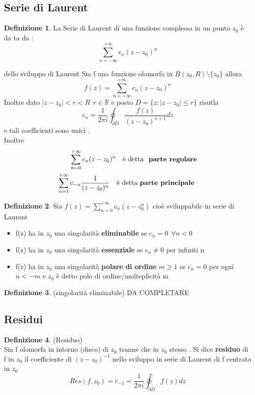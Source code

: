 \documentclass{article}
\theoremstyle{definition}
\newtheorem*{definizione}{Definizione}
\newcommand{\R}{\mathbb{R}}
\newcommand{\norm}[1]{|#1|}
\begin{document}
 				\subsection{Serie di Laurent}
 				\begin{definizione}
 					La Serie di Laurent di una funzione complessa in un punto $z_0$ è da ta da : 
 					$$\sum_{n=-\infty}^{+\infty}c_n(z-z_0)^n$$
 				\end{definizione}
 				\begin{teo}{dello sviluppo di Laurent}{}
Sia f una funzione olomorfa in $B(z_0,R) \setminus \{z_0\}$ allora 
$$f(z)=\sum_{n=-\infty}^{+\infty}c_n(z-z_0)^n$$  Inoltre dato $\norm{z-z_0}<r<R \ \ r \in \R$ e posto $D=\{z : \norm{z-z_0}\leq r\}$ risutla $$c_n=\frac{1}{2\pi i}\oint_{\partial D}\frac{f(z)}{(z-z_0)^{n+1}}dz$$ e tali coefficienti sono unici	.\\ 
Inoltre 
\begin{align*}
	\sum_{n=0}^{+\infty}c_n(z-z_0)^n \ \ \ \text{è detta \textbf{ parte regolare}} \\
	\sum_{n=1}^{+\infty} c_{-n}\frac{1}{(z-z_0)^n} \ \ \ \text{è detta \textbf{parte principale }}
	\end{align*}	\end{teo}
\begin{definizione}
	Sia $f(z)=\sum_{n=0}^{+\infty}c_n (z-z_0^n)$  cioè sviluppabile in serie di Laurent
	\begin{itemize}
		\item f(z) ha in $z_0$ una singolarità \textbf{eliminabile} se $c_n=0 \ \ \forall n <0$
		\item f(z) ha in $z_0$ una singolarità \textbf{essenziale} se $c_n\neq 0$ per infiniti n 
		\item f(z) ha in $z_0$ una singolarità \textbf{polare di ordine} $m\geq 1$ se $c_n=0$ per ogni $n <-m$ e $z_0$ è detto polo di ordine/molteplicità m
	\end{itemize}
\end{definizione} 
\begin{definizione}(singolarità eliminabile)
DA COMPLETARE
\end{definizione}
\subsection{Residui}
\begin{definizione}(Residuo) \\
	Sia f olomorfa in intorno (disco) di $z_0$ tranne che in $z_0$ stesso . Si dice \textbf{residuo} di f in $z_0$ il coefficiente di $(z-z_0)^{-1}$ nello sviluppo in serie di Laurent di f centrato in $z_0$ 
	$$Res(f,z_0)=c_{-1}=\frac{1}{2 \pi i}\oint_{\partial D}f(z)dz$$
\end{definizione}
\end{document}
